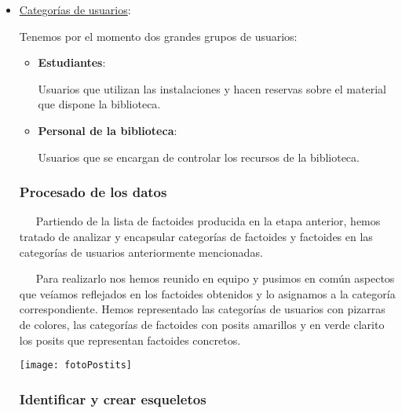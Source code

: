 \documentclass[12pt]{article}
\begin{document}
\begin{itemize}
\item \underline{Categorías de usuarios}:

Tenemos por el momento dos grandes grupos de usuarios:
\begin{itemize}
\renewcommand{\labelitemi}{$\Rightarrow$}
\item \textbf{Estudiantes}: 

Usuarios que utilizan las instalaciones y hacen reservas sobre el material que dispone la biblioteca.

\item \textbf{Personal de la biblioteca}: 

Usuarios que se encargan de controlar los recursos de la biblioteca.
\end{itemize}

\subsubsection{Procesado de los datos}

~~~Partiendo de la lista de factoides producida en la etapa anterior, hemos tratado de analizar y encapsular categorías de factoides y factoides en las categorías de usuarios anteriormente mencionadas.

~~~Para realizarlo nos hemos reunido en equipo y pusimos en común aspectos que veíamos reflejados en los factoides obtenidos y lo asignamos a la categoría correspondiente. Hemos representado las categorías de usuarios con pizarras de colores, las categorías de factoides con posits amarillos y en verde clarito los posits que representan factoides concretos.

\begin{center}
	\centering
	\texttt{[image: fotoPostits]}
\end{center}

\subsubsection{Identificar y crear esqueletos}


\end{itemize}
\end{document}
